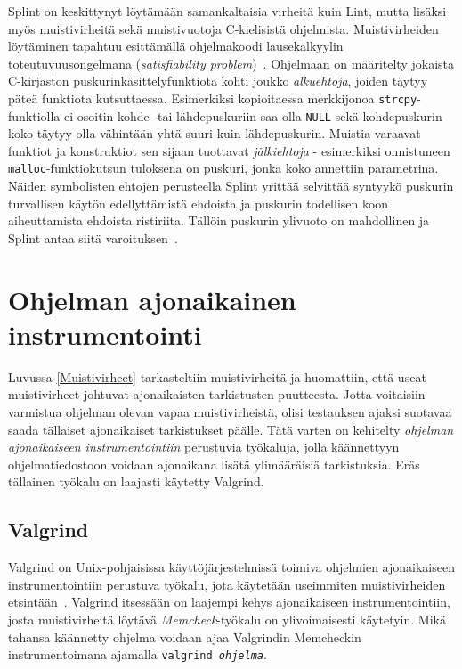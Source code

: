 Splint on keskittynyt löytämään samankaltaisia virheitä kuin Lint,
mutta lisäksi myös muistivirheitä sekä muistivuotoja C-kielisistä ohjelmista.
Muistivirheiden löytäminen tapahtuu esittämällä ohjelmakoodi lausekalkyylin toteutuvuusongelmana
(\emph{satisfiability problem})~\cite{SplintLCLint}.
Ohjelmaan on määritelty jokaista C-kirjaston puskurinkäsittelyfunktiota kohti joukko
\emph{alkuehtoja}, joiden täytyy päteä funktiota kutsuttaessa.
Esimerkiksi kopioitaessa merkkijonoa \texttt{strcpy}-funktiolla ei osoitin kohde- tai lähdepuskuriin
saa olla \texttt{NULL} sekä kohdepuskurin koko täytyy olla vähintään yhtä suuri kuin lähdepuskurin.
Muistia varaavat funktiot ja konstruktiot sen sijaan tuottavat \emph{jälkiehtoja} -
esimerkiksi onnistuneen \texttt{malloc}-funktiokutsun tuloksena on puskuri, jonka
koko annettiin parametrina.
Näiden symbolisten ehtojen perusteella Splint yrittää selvittää syntyykö
puskurin turvallisen käytön edellyttämistä ehdoista ja
puskurin todellisen koon aiheuttamista ehdoista ristiriita.
Tällöin puskurin ylivuoto on mahdollinen ja Splint antaa siitä varoituksen~\cite{SplintLCLint}.

\section{Ohjelman ajonaikainen instrumentointi}
\label{DynaaminenInstrumentointi}
Luvussa \ref{Muistivirheet} tarkasteltiin muistivirheitä ja huomattiin,
että useat muistivirheet johtuvat ajonaikaisten tarkistusten puutteesta.
Jotta voitaisiin varmistua ohjelman olevan vapaa muistivirheistä,
olisi testauksen ajaksi suotavaa saada tällaiset ajonaikaiset tarkistukset päälle.
Tätä varten on kehitelty \emph{ohjelman ajonaikaiseen instrumentointiin} perustuvia työkaluja,
jolla käännettyyn ohjelmatiedostoon voidaan ajonaikana lisätä ylimääräisiä tarkistuksia.
Eräs tällainen työkalu on laajasti käytetty Valgrind.

\subsection{Valgrind}

Valgrind on Unix-pohjaisissa käyttöjärjestelmissä toimiva ohjelmien ajonaikaiseen instrumentointiin
perustuva työkalu, jota käytetään useimmiten muistivirheiden etsintään~\cite{Valgrind}.
Valgrind itsessään on laajempi kehys ajonaikaiseen instrumentointiin,
josta muistivirheitä löytävä \emph{Memcheck}-työkalu on ylivoimaisesti käytetyin.
Mikä tahansa käännetty ohjelma voidaan ajaa Valgrindin Memcheckin instrumentoimana ajamalla
\texttt{valgrind \emph{ohjelma}}.

